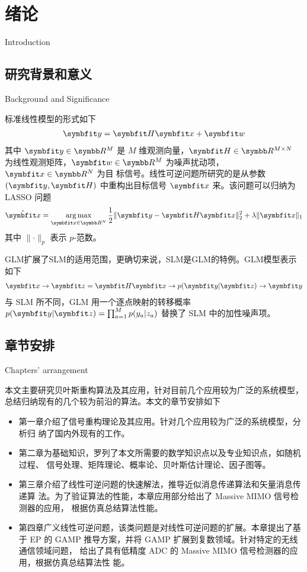 \documentclass[type=master]{../gdutthesis}
\newcommand{\mbb}{\symbb}
\newcommand{\mbfit}{\symbfit}
\DeclareMathOperator*{\argmax}{arg\,max}
\begin{document}
\gduttableofcontents

\mainmatter

\chapter{绪论}{Introduction}
\section{研究背景和意义}{Background and Significance}

标准线性模型的形式如下
\begin{align}
  \mbfit y = \mbfit H \mbfit x + \mbfit w
\end{align}
其中 $\mbfit y \in \mbb R^M$ 是 $M$ 维观测向量，$\mbfit H \in \mbb R^{M \times N}$
为线性观测矩阵，$\mbfit w \in \mbb R^M$ 为噪声扰动项，$\mbfit x \in \mbb R^N$ 为目
标信号。线性可逆问题所研究的是从参数 $(\mbfit y, \mbfit H)$ 中重构出目标信号 $\mbfit x$ 来。该问题可以归纳为 LASSO 问题
\begin{align}
  \hat{ \mbfit x } = \argmax_{ \mbfit x \in \mbb R^N } \frac{1}{2} \lVert \mbfit y - \mbfit H \mbfit x \rVert_2^2 + \lambda \lVert \mbfit x \rVert_1
\end{align}
其中 $\lVert · \rVert_p$ 表示 $p$-范数。

GLM扩展了SLM的适用范围，更确切来说，SLM是GLM的特例。GLM模型表示如下
\begin{align}
  \mbfit x \to \mbfit z = \mbfit H \mbfit x \to p( \mbfit y | \mbfit z ) \to \mbfit y
\end{align}
与 SLM 所不同，GLM 用一个逐点映射的转移概率
$p( \mbfit y | \mbfit z ) = \prod_{a=1}^M p( y_a | z_a )$
替换了 SLM 中的加性噪声项。

\section{章节安排}{Chapters' arrangement}

本文主要研究贝叶斯重构算法及其应用，针对目前几个应用较为广泛的系统模型，
总结归纳现有的几个较为前沿的算法。本文的章节安排如下

\begin{itemize}
  \item 第一章介绍了信号重构理论及其应用。针对几个应用较为广泛的系统模型，分析归
  纳了国内外现有的工作。
  \item 第二章为基础知识，罗列了本文所需要的数学知识点以及专业知识点，如随机过程、
  信号处理、矩阵理论、概率论、贝叶斯估计理论、因子图等。
  \item 第三章介绍了线性可逆问题的快速解法，推导近似消息传递算法和矢量消息传递算
  法。为了验证算法的性能，本章应用部分给出了 Massive MIMO 信号检测器的应用，
  根据仿真总结算法性能。
  \item 第四章广义线性可逆问题，该类问题是对线性可逆问题的扩展。本章提出了基于 
  EP 的 GAMP 推导方案，并将 GAMP 扩展到复数领域。针对特定的无线通信领域问题，
  给出了具有低精度 ADC 的 Massive MIMO 信号检测器的应用，根据仿真总结算法性
  能。
\end{itemize}
\end{document}
